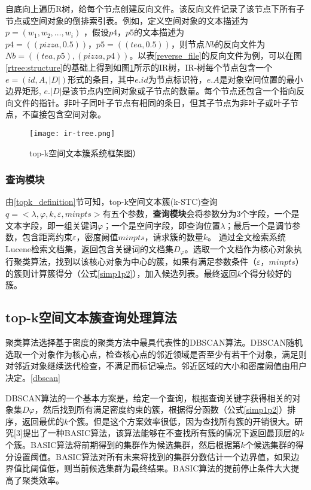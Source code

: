 自底向上遍历R树，给每个节点创建反向文件。该反向文件记录了该节点下所有子节点或空间对象的倒排索引表。例如，定义空间对象的文本描述为$p=(w_1,w_2,…,w_i)$ ，假设$p4，p5$的文本描述为$p4 = ((pizza, 0.5))，p5 = ((tea, 0.5))$，则节点$Nb$的反向文件为$Nb = ((tea, p5), (pizza, p4))$。以表\ref{reverse_file}的反向文件为例，可以在图\ref{rtree:structure}的基础上得到如图\ref{ir_tree_example}所示的IR树，IR-树每个节点包含一个$e=(id,A,|D|)$形式的条目，其中$e.id$为节点标识符，$e. A$是对象空间位置的最小边界矩形, $e. \left| D \right|$是该节点内空间对象或子节点的数量。每个节点还包含一个指向反向文件的指针。非叶子同叶子节点有相同的条目，但其子节点为非叶子或叶子节点，不直接包含空间对象。

\begin{figure}[htbp]
	\begin{center}
		\texttt{[image: ir-tree.png]}
		\caption{top-k空间文本簇系统框架图）}
		\label{ir_tree_example}
	\end{center}
\end{figure}
\subsubsection{查询模块}

由\ref{topk_definition}节可知，top-k空间文本簇(k-STC)查询$q=<\lambda, \varphi, k, \varepsilon, minpts>$有五个参数，\textbf{查询模块}会将参数分为3个字段，一个是文本字段，即一组关键词$\varphi$；一个是空间字段，即查询位置$\lambda$；最后一个是调节参数，包含距离约束$\varepsilon$，密度阙值$minpts$，请求簇的数量$k$。
通过全文检索系统Lucene检索文档集，返回包含关键词的文档集$D_\varphi$。选取一个文档作为核心对象执行聚类算法，找到以该核心对象为中心的簇，如果有满足参数条件$（\varepsilon，minpts）$的簇则计算簇得分（公式\ref{simp1p2}），加入候选列表。最终返回$k$个得分较好的簇。

\subsection{top-k空间文本簇查询处理算法}

聚类算法选择基于密度的聚类方法中最具代表性的DBSCAN算法。DBSCAN随机选取一个对象作为核心点，检查核心点的邻近领域是否至少有若干个对象，满足则对邻近对象继续迭代检查，不满足而标记噪点。邻近区域的大小和密度阙值由用户决定。\ref{dbscan}

DBSCAN算法的一个基本方案是，给定一个查询，根据查询关键字获得相关的对象集$D\varphi$，然后找到所有满足密度约束的簇，根据得分函数（公式\ref{simp1p2}）排序，返回最优的$k$个簇。但是这个方案效率很低，因为查找所有簇的开销很大。研究[3]提出了一种BASIC算法，该算法能够在不查找所有簇的情况下返回最顶层的$k$个簇。BASIC算法将前期得到的集群作为候选集群，然后根据第$k$个候选集群的得分设置阈值。BASIC算法对所有未来将找到的集群分数估计一个边界值，如果边界值比阈值低，则当前候选集群为最终结果。BASIC算法的提前停止条件大大提高了聚类效率。

